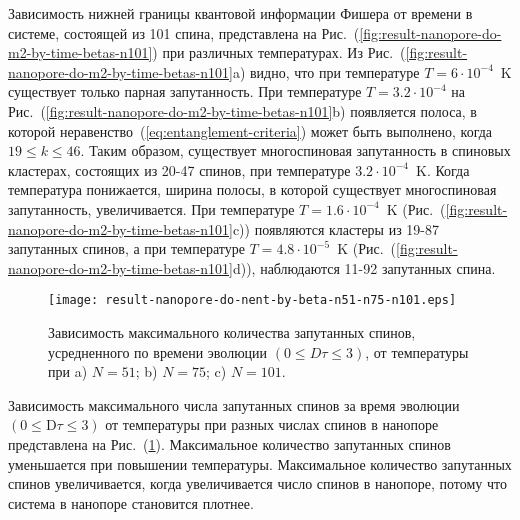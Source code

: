 Зависимость нижней границы квантовой информации Фишера от времени в системе, состоящей из 101 спина, представлена на Рис.~(\ref{fig:result-nanopore-do-m2-by-time-betas-n101}) при различных температурах.
Из Рис.~(\ref{fig:result-nanopore-do-m2-by-time-betas-n101}a) видно, что при температуре $T=6\cdot10^{-4}$~K существует только парная запутанность.
При температуре $T=3.2\cdot10^{-4}$ на Рис.~(\ref{fig:result-nanopore-do-m2-by-time-betas-n101}b) появляется полоса, в которой неравенство~(\ref{eq:entanglement-criteria}) может быть выполнено, когда $19 \leq k \leq 46$.
Таким образом, существует многоспиновая запутанность в спиновых кластерах, состоящих из 20-47 спинов, при температуре $3.2\cdot10^{-4}$~K.
Когда температура понижается, ширина полосы, в которой существует многоспиновая запутанность, увеличивается.
При температуре $T=1.6\cdot10^{-4}$~K (Рис.~(\ref{fig:result-nanopore-do-m2-by-time-betas-n101}c)) появляются кластеры из 19-87 запутанных спинов, а при температуре $T=4.8\cdot10^{-5}$~K (Рис.~(\ref{fig:result-nanopore-do-m2-by-time-betas-n101}d)), наблюдаются 11-92 запутанных спина.

\begin{figure}[H]
 	\texttt{[image: result-nanopore-do-nent-by-beta-n51-n75-n101.eps]}
	\caption{
	  Зависимость максимального количества запутанных спинов,
	  усредненного по времени эволюции $(0 \leq D\tau \leq 3)$,
	  от температуры при  a) $N=51$; b) $N=75$; c) $N=101$.
	}
	\label{fig:result-nanopore-do-nent-by-beta-n51-n75-n101}
\end{figure}

Зависимость максимального числа запутанных спинов за время эволюции $({0}\leq \mathrm{D}\tau\leq{3})$ от температуры при разных числах спинов в нанопоре представлена на Рис.~(\ref{fig:result-nanopore-do-nent-by-beta-n51-n75-n101}).
Максимальное количество запутанных спинов уменьшается при повышении температуры.
Максимальное количество запутанных спинов увеличивается, когда увеличивается число спинов в нанопоре, потому что система в нанопоре становится плотнее.

